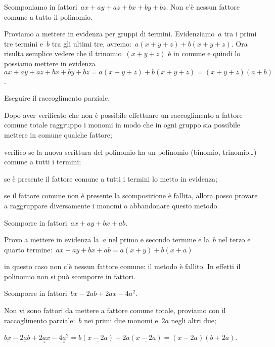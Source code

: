  \begin{esempio}
Scomponiamo in fattori~\(ax+ay+az+bx+by+bz\). Non c'è nessun fattore comune a 
tutto il polinomio.

Proviamo a mettere in evidenza per gruppi di termini. Evidenziamo~\(a\) tra i 
primi tre termini e~\(b\) tra gli ultimi tre, 
avremo:~\(a(x+y+z)+b(x+y+z)\). Ora risulta semplice vedere che il 
trinomio~\((x+y+z)\) è in comune e quindi lo possiamo mettere 
in evidenza~\(ax+ay+az+bx+by+bz=a(x+y+z)+b(x+y+z)=(x+y+z)(a+b)\).
 \end{esempio}

\begin{procedura}
Eseguire il raccoglimento parziale.
\begin{enumeratea}
\item Dopo aver verificato che non è possibile effettuare un raccoglimento a 
 fattore comune totale raggruppo i monomi in modo che in ogni gruppo sia 
 possibile mettere in comune qualche fattore;
\item verifico se la nuova scrittura del polinomio ha un polinomio 
 (binomio, trinomio\ldots) comune a tutti i termini;
\item se è presente il fattore comune a tutti i termini lo metto in evidenza;
\item se il fattore comune non è presente la scomposizione è fallita, allora 
 posso provare a raggruppare diversamente i monomi o abbandonare questo metodo.
\end{enumeratea}
\end{procedura}

 \begin{esempio}
Scomporre in fattori~\(ax+ay+bx+ab\).
  \begin{enumeratea}
  \item Provo a mettere in evidenza la~\(a\) nel primo e secondo termine e 
   la~\(b\) nel terzo e quarto termine:~\(ax+ay+bx+ab=a(x+y)+b(x+a)\)
  \item in questo caso non c'è nessun fattore comune: il metodo è fallito. 
   In effetti il polinomio non si può scomporre in fattori.
  \end{enumeratea}
 \end{esempio}

 \begin{esempio}
Scomporre in fattori~\(bx-2ab+2ax-4a^{2}\).
 \begin{enumeratea}
 \item Non vi sono fattori da mettere a fattore comune totale, proviamo con 
  il raccoglimento parziale:~\(b\) nei primi due monomi e~\(2a\) negli altri due;
 \item \(\underline{bx} -\underline{2ab}+\underline{\underline{2ax}}-
        \underline{\underline{4a^{2}}}=
        b(\underline{x-2a})+2a(\underline{x-2a})=(x-2a)(b+2a)\).
 \end{enumeratea}
 \end{esempio}


